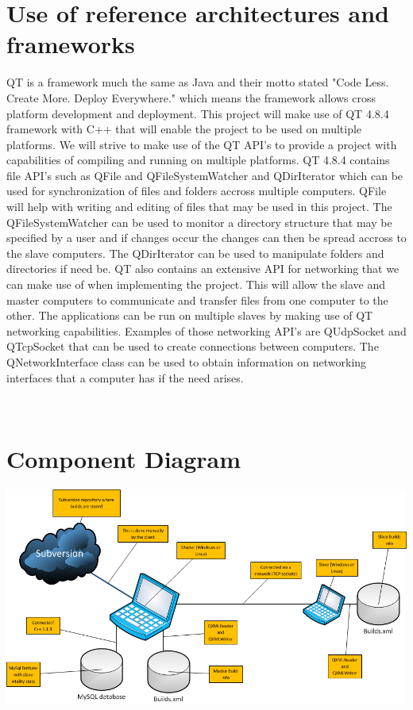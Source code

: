 \documentclass[a4paper,12pt,final]{article}
\begin{document}
\section{Use of reference architectures and\\ frameworks}
QT is a framework much the same as Java and their motto stated "Code Less. Create More. Deploy Everywhere." which means the framework allows cross platform development and deployment. This project will make use of QT 4.8.4 framework with C++ that will enable the project to be used on multiple platforms. We will strive to make use of the QT API's to provide a project with capabilities of compiling and running on multiple platforms.
\vspace{6pt}\newline
QT 4.8.4 contains file API's such as QFile and QFileSystemWatcher and QDirIterator which can be used for synchronization of files and folders accross multiple computers. QFile will help with writing and editing of files that may be used in this project. The QFileSystemWatcher can be used to monitor a directory structure that may be specified by a user and if changes occur the changes can then be spread accross to the slave computers. The QDirIterator can be used to manipulate folders and directories if need be.
\vspace{6pt}\newline
QT also contains an extensive API for networking that we can make use of when implementing the project. This will allow the slave and master computers to communicate and transfer files from one computer to the other. The applications can be run on multiple slaves by making use of QT networking capabilities. Examples of those networking API's are QUdpSocket and QTcpSocket that can be used to create connections between computers. The QNetworkInterface class can be used to obtain information on networking interfaces that a computer has if the need arises.

\newpage
\textbf{\\}
\section{Component Diagram}
\begin{center}
\includegraphics[angle = 90, scale=0.7]{ComponentDiag.png}
\end{center}
\end{document}
